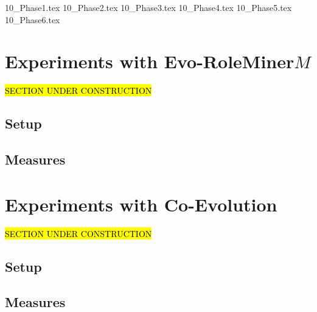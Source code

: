 {10_Phase1.tex}
{10_Phase2.tex}
{10_Phase3.tex}
{10_Phase4.tex}
{10_Phase5.tex}
{10_Phase6.tex}

\section{Experiments with Evo-RoleMiner$M$}
\hl{SECTION UNDER CONSTRUCTION}\\
\subsection{Setup}
\subsection{Measures}

\section{Experiments with Co-Evolution}
\hl{SECTION UNDER CONSTRUCTION}\\
\subsection{Setup}
\subsection{Measures}

